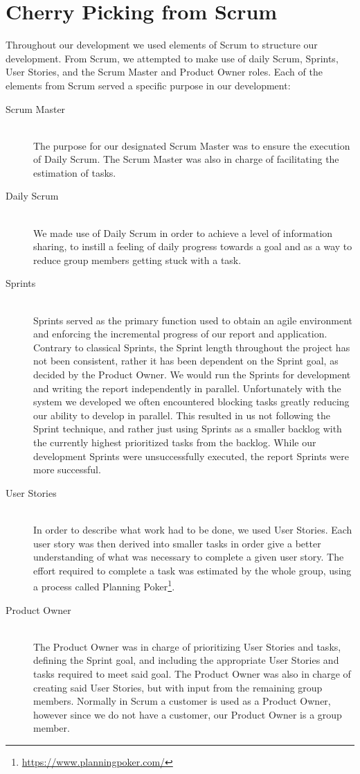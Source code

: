 \section{Cherry Picking from Scrum}
Throughout our development we used elements of Scrum to structure our development.
From Scrum, we attempted to make use of daily Scrum, Sprints, User Stories, and the Scrum Master and Product Owner roles.
Each of the elements from Scrum served a specific purpose in our development:
\begin{description}
    \item [Scrum Master] \hfill \\
        The purpose for our designated Scrum Master was to ensure the execution of Daily Scrum.
        The Scrum Master was also in charge of facilitating the estimation of tasks.
    \item [Daily Scrum] \hfill \\
        We made use of Daily Scrum in order to achieve a level of information sharing, to instill a feeling of daily progress towards a goal and as a way to reduce group members getting stuck with a task.
    \item [Sprints] \hfill \\
        Sprints served as the primary function used to obtain an agile environment and enforcing the incremental progress of our report and application.
        Contrary to classical Sprints, the Sprint length throughout the project has not been consistent, rather it has been dependent on the Sprint goal, as decided by the Product Owner.
        We would run the Sprints for development and writing the report independently in parallel.
        Unfortunately with the system we developed we often encountered blocking tasks greatly reducing our ability to develop in parallel.
        This resulted in us not following the Sprint technique, and rather just using Sprints as a smaller backlog with the currently highest prioritized tasks from the backlog.
        While our development Sprints were unsuccessfully executed, the report Sprints were more successful.
    \item [User Stories] \hfill \\
        In order to describe what work had to be done, we used User Stories.
        Each user story was then derived into smaller tasks in order give a better understanding of what was necessary to complete a given user story.
        The effort required to complete a task was estimated by the whole group, using a process called Planning Poker\footnote{\url{https://www.planningpoker.com/}}.
    \item [Product Owner] \hfill \\
        The Product Owner was in charge of prioritizing User Stories and tasks, defining the Sprint goal, and including the appropriate User Stories and tasks required to meet said goal.
        The Product Owner was also in charge of creating said User Stories, but with input from the remaining group members.
        Normally in Scrum a customer is used as a Product Owner, however since we do not have a customer, our Product Owner is a group member.
\end{description}

